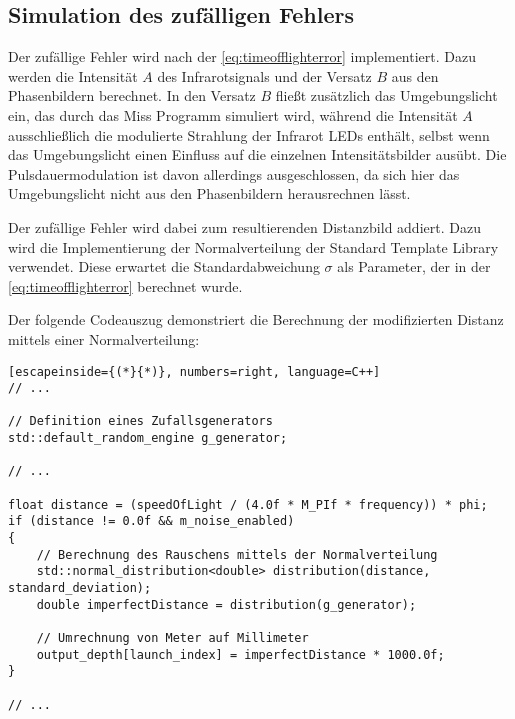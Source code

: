 \documentclass[thesis.tex]{subfiles}
\begin{document}
\subsection{Simulation des zufälligen Fehlers}
%
Der zufällige Fehler wird nach der \autoref{eq:timeofflighterror} implementiert. Dazu werden die Intensität $A$ des Infrarotsignals und der Versatz $B$ aus den Phasenbildern berechnet. In den Versatz $B$ fließt zusätzlich das Umgebungslicht ein, das durch das Miss Programm simuliert wird, während die Intensität $A$ ausschließlich die modulierte Strahlung der Infrarot LEDs enthält, selbst wenn das Umgebungslicht einen Einfluss auf die einzelnen Intensitätsbilder ausübt. Die Pulsdauermodulation ist davon allerdings ausgeschlossen, da sich hier das Umgebungslicht nicht aus den Phasenbildern herausrechnen lässt.

Der zufällige Fehler wird dabei zum resultierenden Distanzbild addiert. Dazu wird die Implementierung der Normalverteilung der Standard Template Library verwendet. Diese erwartet die Standardabweichung $\sigma$ als Parameter, der in der \autoref{eq:timeofflighterror} berechnet wurde. 

Der folgende Codeauszug demonstriert die Berechnung der modifizierten Distanz mittels einer Normalverteilung:
%
\begin{lstlisting}[escapeinside={(*}{*)}, numbers=right, language=C++]
// ...

// Definition eines Zufallsgenerators
std::default_random_engine g_generator;

// ...

float distance = (speedOfLight / (4.0f * M_PIf * frequency)) * phi;
if (distance != 0.0f && m_noise_enabled)
{
    // Berechnung des Rauschens mittels der Normalverteilung
    std::normal_distribution<double> distribution(distance, standard_deviation);
    double imperfectDistance = distribution(g_generator);

    // Umrechnung von Meter auf Millimeter
    output_depth[launch_index] = imperfectDistance * 1000.0f;
}

// ...
\end{lstlisting}

\subfilebib %
\end{document}
